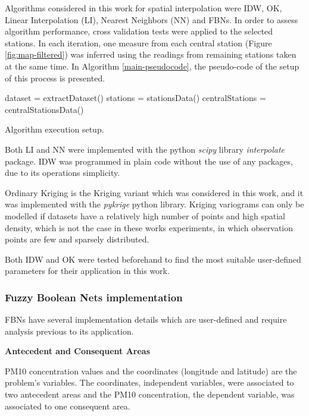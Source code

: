 Algorithms considered in this work for spatial interpolation were IDW, OK, Linear Interpolation (LI), Nearest Neighbors (NN) and FBNs.
In order to assess algorithm performance, cross validation tests were applied to the selected stations.
In each iteration, one measure from each central station (Figure \ref{fig:map-filtered}) was inferred using the readings
from remaining stations taken at the same time. In Algorithm \ref{main-pseudocode}, the pseudo-code of the setup of this process is presented.

\begin{algorithm}[!htbp]
\footnotesize
\linespread{1.15}\selectfont
\SetAlgoLined
 dataset = extractDataset()\;
 stations = stationsData()\;
 centralStations = centralStationsData()\;
 \caption{Algorithm execution setup.}
 \label{main-pseudocode}
\end{algorithm}

Both LI and NN were implemented with the python \textit{scipy} library \textit{interpolate} package. IDW was programmed in plain code without the use of any packages, due to its operations simplicity. 

Ordinary Kriging is the Kriging variant which was considered in this work, and it was implemented with the \textit{pykrige} python library. Kriging variograms can only be modelled if datasets have a relatively high number of points and high spatial density, which is not the case in these works experiments, in which observation points are few and sparsely distributed. 

Both IDW and OK were tested beforehand to find the most suitable user-defined parameters for their application in this work.

\subsubsection{Fuzzy Boolean Nets implementation}

FBNs have several implementation details which are user-defined and require analysis previous to its application.

\textbf{Antecedent and Consequent Areas}

PM10 concentration values and the coordinates (longitude and latitude) are the problem's variables. The coordinates, independent variables, were associated to two antecedent areas and the PM10 concentration, the dependent variable, was associated to one consequent area.

